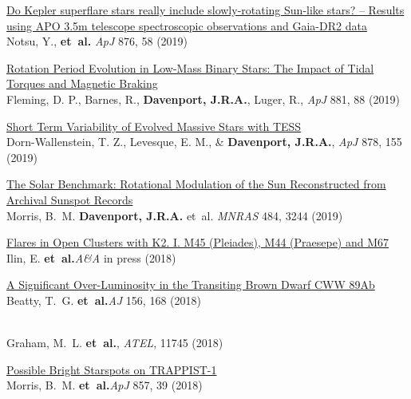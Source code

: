 \documentclass{article}
\begin{document}
\begin{llist}
\begin{etaremune}[leftmargin=10pt]
\item{\sc\href{https://arxiv.org/abs/1904.00142}{\color{NavyBlue}Do Kepler superflare stars really include slowly-rotating Sun-like stars? -- Results using APO 3.5m telescope spectroscopic observations and Gaia-DR2 data }}\\
Notsu, Y., {\bf et~al.} {\em ApJ} 876, 58 (2019)

\item{\sc\href{https://arxiv.org/abs/1903.05686}{\color{NavyBlue}Rotation Period Evolution in Low-Mass Binary Stars: The Impact of Tidal Torques and Magnetic Braking}}\\
Fleming, D. P., Barnes, R., {\bf Davenport, J.R.A.}, Luger, R., {\em ApJ} 881, 88 (2019)


\item{\sc\href{https://arxiv.org/abs/1901.09930}{\color{NavyBlue}Short Term Variability of Evolved Massive Stars with TESS}}\\
Dorn-Wallenstein, T. Z., Levesque, E. M., \& {\bf Davenport, J.R.A.}, {\em ApJ} 878, 155 (2019)

\item{\sc\href{https://arxiv.org/abs/1901.04557}{\color{NavyBlue}The Solar Benchmark: Rotational Modulation of the Sun Reconstructed from Archival Sunspot Records}}\\
Morris, B.~M. {\bf Davenport, J.R.A.} et~al. {\em MNRAS} 484, 3244 (2019)



\item{\sc\href{https://arxiv.org/abs/1812.06725}{\color{NavyBlue}Flares in Open Clusters with K2. I. M45 (Pleiades), M44 (Praesepe) and M67}}\\
Ilin, E. {\bf et~al.}{\em A\&A} in press (2018)

\item{\sc\href{https://arxiv.org/abs/1807.11500}{\color{NavyBlue}A Significant Over-Luminosity in the Transiting Brown Dwarf CWW 89Ab}}\\
Beatty, T.~G. {\bf et~al.}{\em AJ} 156, 168 (2018)

\item{\href{http://www.astronomerstelegram.org/?read=11745}{\color{NavyBlue}{\sc ZTF Bright Transient Survey classifications}}}\\
Graham, M.~L. {\bf et~al.}, {\em ATEL}, 11745 (2018)


\item{\sc \href{https://arxiv.org/abs/1803.04543}{\color{NavyBlue}Possible Bright Starspots on TRAPPIST-1}}\\
Morris, B.~M. {\bf et~al.}{\em ApJ} 857, 39 (2018)



\end{etaremune}
\end{llist}
\end{document}
